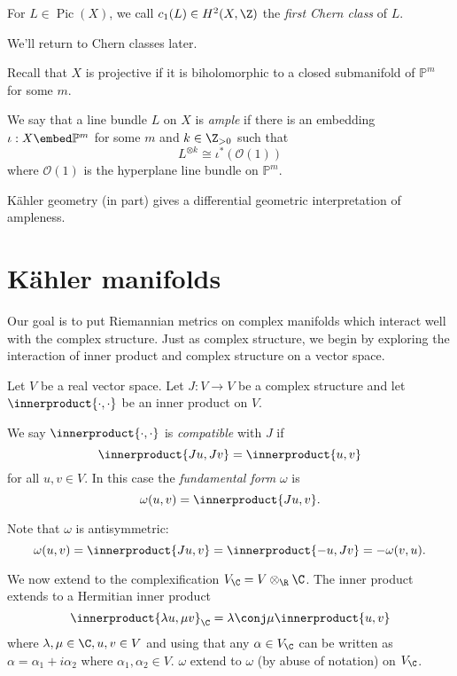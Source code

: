 \documentclass[a4paper]{article}
\renewcommand{\P}{\mathbb P} %
\DeclareMathOperator{\Pic}{Pic} %
\newcommand*{\ip}{\innerproduct}
\begin{document}
\begin{definition}
  For \(L \in \Pic(X)\), we call \(c_1(L) \in H^2(X, \Z)\) the \emph{first Chern class} of \(L\).
\end{definition}
We'll return to Chern classes later.

Recall that \(X\) is projective if it is biholomorphic to a closed submanifold of \(\P^m\) for some \(m\).

\begin{definition}
  We say that a line bundle \(L\) on \(X\) is \emph{ample} if there is an embedding \(\iota: X \embed \P^m\) for some \(m\) and \(k \in \Z_{> 0}\) such that
  \[
    L^{\otimes k} \cong \iota^*(\mathcal O(1))
  \]
  where \(\mathcal O(1)\) is the hyperplane line bundle on \(\P^m\).
\end{definition}

Kähler geometry (in part) gives a differential geometric interpretation of ampleness.

\section{Kähler manifolds}

Our goal is to put Riemannian metrics on complex manifolds which interact well with the complex structure. Just as complex structure, we begin by exploring the interaction of inner product and complex structure on a vector space.

Let \(V\) be a real vector space. Let \(J: V \to V\) be a complex structure and let \(\ip{\cdot, \cdot}\) be an inner product on \(V\).

\begin{definition}
  We say \(\ip{\cdot, \cdot}\) is  \emph{compatible} with \(J\) if
  \[
    \ip{Ju, Jv} = \ip{u, v}
  \]
  for all \(u, v \in V\). In this case the \emph{fundamental form} \(\omega\) is
  \[
    \omega(u, v) = \ip{Ju, v}.
  \]
\end{definition}
Note that \(\omega\) is antisymmetric:
\[
  \omega(u, v) = \ip{Ju, v} = \ip{-u, Jv} = - \omega(v, u).
\]

We now extend to the complexification \(V_\C = V \otimes_\R \C\). The inner product extends to a Hermitian inner product
\[
  \ip{\lambda u, \mu v}_\C = \lambda \conj \mu \ip{u, v}
\]
where \(\lambda, \mu \in \C, u, v \in V\) and using that any \(\alpha \in V_\C\) can be written as \(\alpha = \alpha_1 + i\alpha_2\) where \(\alpha_1, \alpha_2 \in V\). \(\omega\) extend to \(\omega\) (by abuse of notation) on \(V_\C\).
\end{document}
